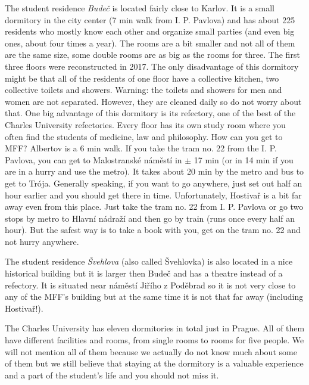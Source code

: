 The student residence \textit{Budeč} is located fairly close to Karlov. It is a
small dormitory in the city center (7 min walk from I. P. Pavlova) and has about
225 residents who mostly know each other and organize small parties (and even
big ones, about four times a year).
The rooms are a bit smaller and not all of them are the same size, some double
rooms are as big as the rooms for three.
The first three floors were reconstructed in 2017. The only disadvantage of this
dormitory might be that all of the residents of one floor have a collective
kitchen, two collective toilets and showers. Warning: the toilets and showers
for men and women are not separated.
However, they are cleaned daily so do not worry about that.
One big advantage of this dormitory is its refectory, one of the best of the
Charles University refectories.
Every floor has its own study room where you often find the students of
medicine, law and philosophy.
How can you get to MFF? Albertov is a 6 min walk. If you take the tram no. 22
from the I. P. Pavlova, you can get to Malostranské náměstí in $\pm$ 17 min (or
in 14 min if you are in a hurry and use the metro). It takes about 20 min by the
metro and bus to get to Trója.
Generally speaking, if you want to go anywhere, just set out half an hour
earlier and you should get there in time.
Unfortunately, Hostivař is a bit far away even from this place. Just take the
tram no. 22 from I. P. Pavlova or go two stops by metro to Hlavní nádraží and
then go by train (runs once every half an hour).
But the safest way is to take a book with you, get on the tram no. 22 and not
hurry anywhere.

The student residence \textit{Švehlova} (also called Švehlovka) is also located
in a nice historical building but it is larger then Budeč and has a theatre
instead of a refectory.
It is situated near náměstí Jiřího z Poděbrad so it is not very close to any of
the MFF's building but at the same time it is not that far away (including
Hostivař!).



The Charles University has eleven dormitories in total just in Prague. All of
them have different facilities and rooms, from single rooms to rooms for five
people.
We will not mention all of them because we actually do not know much about some
of them but we still believe that staying at the dormitory is a valuable
experience and a part of the student's life and you should not miss it.